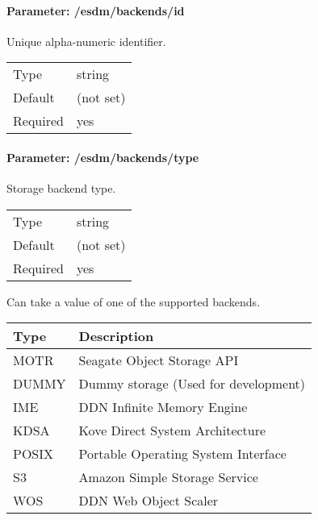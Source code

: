\paragraph{Parameter: /esdm/backends/id}

Unique alpha-numeric identifier.

\begin{preserve}
 \noindent
 \begin{tabular}{ll}
   Type     & string    \\ 
   Default  & (not set) \\ 
   Required & yes       \\ 
 \end{tabular} 
\end{preserve}
\FloatBarrier
\vspace{\gapsize}


\paragraph{Parameter: /esdm/backends/type}
Storage backend type. 

\begin{preserve}
  \noindent
  \begin{tabular}{ll}
    Type     & string    \\ 
    Default  & (not set) \\ 
    Required & yes       \\ 
  \end{tabular}
\end{preserve}

Can take a value of one of the supported backends.

\begin{preserve}
  \noindent
  \begin{center}
    \begin{tabular}{ll}
      Type   & Description                          \\ 
      \hline
      MOTR   & Seagate Object Storage API           \\ 
      DUMMY  & Dummy storage (Used for development) \\ 
      IME    & DDN Infinite Memory Engine           \\ 
      KDSA   & Kove Direct System Architecture      \\ 
      POSIX  & Portable Operating System Interface  \\ 
      S3     & Amazon Simple Storage Service        \\ 
      WOS    & DDN Web Object Scaler                \\ 
    \end{tabular}
  \end{center}
\end{preserve}
\FloatBarrier
\vspace{\gapsize}


